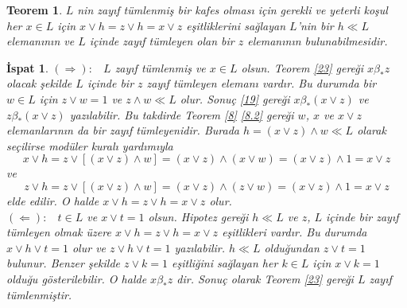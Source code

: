 \documentclass[a4paper,12pt]{article}
\numberwithin{equation}{section}
\theoremstyle{italik}
\newtheorem{teorem}{Teorem}[section]
\newtheorem*{ispat}{İspat}
\begin{document}
\begin{teorem}\label{24}
  $ L $ nin zayıf tümlenmiş bir kafes olması için gerekli ve yeterli koşul her $ x \in L $ için 
  $ x \vee h = z \vee h = x \vee z $ eşitliklerini sağlayan $ L $'nin bir $ h \ll L $ elemanının ve 
  $ L $ içinde zayıf tümleyen olan bir $ z $ elemanının bulunabilmesidir. 
\end{teorem}
\begin{ispat}
    $ ( \Rightarrow ): $ \  $ L $ zayıf tümlenmiş ve $ x \in L $ olsun. Teorem \ref{23} gereği $ x \beta_* z $ 
    olacak şekilde $ L $ içinde bir $ z $ zayıf tümleyen elemanı vardır. Bu durumda bir $ w \in L $ için 
    $ z \vee w = 1 $ ve $ z \wedge w \ll L $ olur. Sonuç \ref{19} gereği 
    $ x \beta_* ( x \vee z ) $ ve $ z \beta_* ( x \vee z ) $ yazılabilir. Bu takdirde Teorem \ref{8} \ref{8.2} gereği 
    $ w $, $ x $ ve $ x \vee z $ elemanlarının da bir zayıf tümleyenidir. Burada $ h = ( x \vee z ) \wedge w \ll L $ 
    olarak seçilirse modüler kuralı yardımıyla 
    $$ x \vee h = z \vee \left[ ( x \vee z ) \wedge w \right] = ( x \vee z ) \wedge ( x \vee w ) = ( x \vee z ) \wedge 1 = x \vee z $$
    ve 
    $$ z \vee h = z \vee \left[ ( x \vee z ) \wedge w \right] = ( x \vee z ) \wedge ( z \vee w ) = ( x \vee z ) \wedge 1 = x \vee z $$ 
    elde edilir. O halde $ x \vee h = z \vee h =  x \vee z $ olur. \\
    $ ( \Leftarrow ): $ \ $ t \in L $ ve $ x \vee t = 1 $ olsun. Hipotez gereği $ h \ll L $ ve $ z $, $ L $ içinde 
    bir zayıf tümleyen olmak üzere $ x \vee h = z \vee h =  x \vee z $ eşitlikleri vardır. 
    Bu durumda $ x \vee h \vee t = 1 $ olur ve $ z \vee h \vee t = 1 $ yazılabilir. $ h \ll L $ olduğundan $ z \vee t = 1 $ bulunur. 
    Benzer şekilde $ z \vee k = 1 $ eşitliğini sağlayan her $ k \in L $ için $ x \vee k = 1 $ olduğu gösterilebilir. 
    O halde $ x \beta_* z $ dir. Sonuç olarak Teorem \ref{23} gereği $ L $ zayıf tümlenmiştir. 

\end{ispat}






\cleardoublepage
{}
\printbibliography[maxnames=99,title={KAYNAKÇA}]
\end{document}
